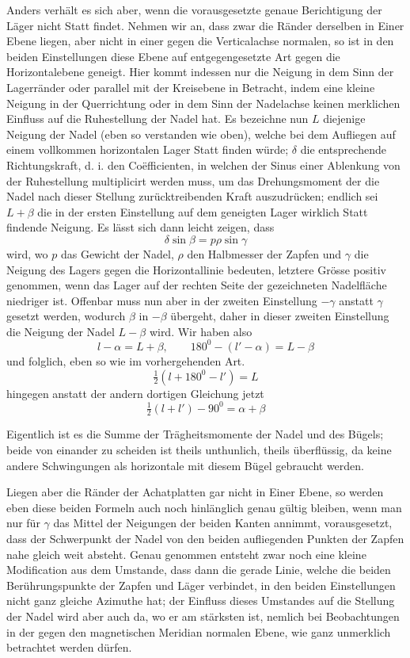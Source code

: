 Anders verhält es sich aber, wenn die vorausgesetzte genaue Berichtigung der Läger nicht Statt findet. Nehmen wir an, dass zwar die Ränder derselben in Einer Ebene liegen, aber nicht in einer gegen die Verticalachse normalen, so ist in den beiden Einstellungen diese Ebene auf entgegengesetzte Art gegen die Horizontalebene geneigt. Hier kommt indessen nur die Neigung in dem Sinn der Lagerränder oder parallel mit der Kreisebene in Betracht, indem eine kleine Neigung in der Querrichtung oder in dem Sinn der Nadelachse keinen merklichen Einfluss auf die Ruhestellung der Nadel hat. Es bezeichne nun $L$ diejenige Neigung der Nadel (eben so verstanden wie oben), welche bei dem Aufliegen auf einem vollkommen horizontalen Lager Statt finden würde; $\delta$ die entsprechende Richtungskraft, d. i. den Coëfficienten, in welchen der Sinus einer Ablenkung von der Ruhestellung multiplicirt werden muss, um das Drehungsmoment der die Nadel nach dieser Stellung zurücktreibenden Kraft auszudrücken; endlich sei $L+\beta$ die in der ersten Einstellung auf dem geneigten Lager wirklich Statt findende Neigung. Es lässt sich dann leicht zeigen, dass
\[
\delta\sin\beta=p\rho\sin\gamma
\]
wird, wo $p$ das Gewicht der Nadel, $\rho$ den Halbmesser der Zapfen und $\gamma$ die Neigung des Lagers gegen die Horizontallinie bedeuten, letztere Grösse positiv genommen, wenn das Lager auf der rechten Seite der gezeichneten Nadelfläche niedriger ist. Offenbar muss nun aber in der zweiten Einstellung $-\gamma$ anstatt $\gamma$ gesetzt werden, wodurch $\beta$ in $-\beta$ übergeht, daher in dieser zweiten Einstellung die Neigung der Nadel $L-\beta$ wird. Wir haben also
\[
l-\alpha=L+\beta,\qquad180^0-(l'-\alpha)=L-\beta
\]
und folglich, eben so wie im vorhergehenden Art.
\[
\tfrac{1}{2}(l+180^0-l')=L
\]
hingegen anstatt der andern dortigen Gleichung jetzt
\[
\tfrac{1}{2}(l+l')-90^0=\alpha+\beta
\]


\expandafter\def\csname HistoricalNoteText465\endcsname{Eigentlich ist es die Summe der Trägheitsmomente der Nadel und des Bügels; beide von einander zu scheiden ist theils unthunlich, theils überflüssig, da keine andere Schwingungen als horizontale mit diesem Bügel gebraucht werden.}
\par\clearpage
{}Liegen aber die Ränder der Achatplatten gar nicht in Einer Ebene, so werden eben diese beiden Formeln auch noch hinlänglich genau gültig bleiben, wenn man nur für $\gamma$ das Mittel der Neigungen der beiden Kanten annimmt, vorausgesetzt, dass der Schwerpunkt der Nadel von den beiden aufliegenden Punkten der Zapfen nahe gleich weit absteht. Genau genommen entsteht zwar noch eine kleine Modification aus dem Umstande, dass dann die gerade Linie, welche die beiden Berührungspunkte der Zapfen und Läger verbindet, in den beiden Einstellungen nicht ganz gleiche Azimuthe hat; der Einfluss dieses Umstandes auf die Stellung der Nadel wird aber auch da, wo er am stärksten ist, nemlich bei Beobachtungen in der gegen den magnetischen Meridian normalen Ebene, wie ganz unmerklich betrachtet werden dürfen.

